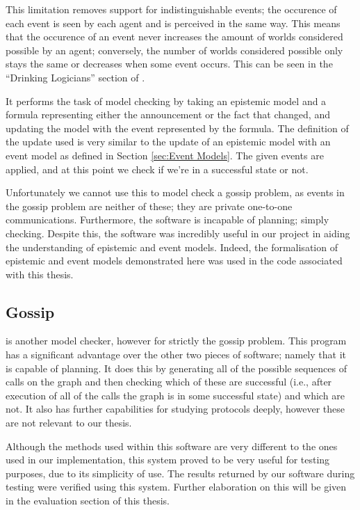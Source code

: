 \documentclass[10pt, a4paper]{report}
\begin{document}
This limitation removes support for indistinguishable events; the occurence of
each event is seen by each agent and is perceived in the same way. This means
that the occurence of an event never increases the amount of worlds considered
possible by an agent; conversely, the number of worlds considered possible only
stays the same or decreases when some event occurs. This can be seen in the
``Drinking Logicians'' section of \cite{DEMO-S5}.

It performs the task of model checking by taking an epistemic model and a
formula representing either the announcement or the fact that changed, and
updating the model with the event represented by the formula. The definition of
the update used is very similar to the update of an epistemic model with an
event model as defined in Section \ref{sec:Event Models}. The given events are
applied, and at this point we check if we're in a successful state or not.

\bigskip

Unfortunately we cannot use this to model check a gossip problem, as events in
the gossip problem are neither of these; they are private one-to-one
communications. Furthermore, the software is incapable of planning; simply
checking. Despite this, the software was incredibly useful in our project in
aiding the understanding of epistemic and event models. Indeed, the
formalisation of epistemic and event models demonstrated here was used in the
code associated with this thesis.

\subsection{Gossip}

\cite{GithubGossip} is another model checker, however for strictly the gossip
problem. This program has a significant advantage over the other two pieces of
software; namely that it is capable of planning. It does this by generating all
of the possible sequences of calls on the graph and then checking which of these
are successful (i.e., after execution of all of the calls the graph is in some
successful state) and which are not. 
It also has further capabilities for
studying protocols deeply, however these are not relevant to our thesis.

Although the methods used within this software are very different to the ones
used in our implementation, this system proved to be very useful for testing
purposes, due to its simplicity of use. The results returned by our software
during testing were verified using this system. Further elaboration on this will
be given in the evaluation section of this thesis.
\end{document}

